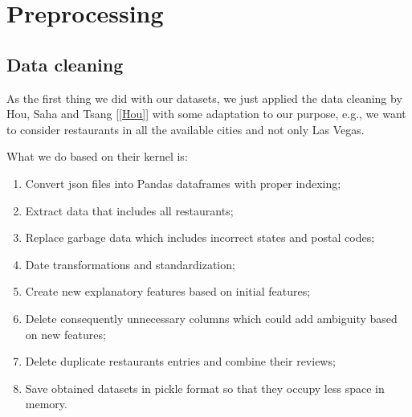 
\section{Preprocessing} \label{sec:preprocessing}

\subsection{Data cleaning} \label{sec:data-clean}

As the first thing we did with our datasets, we just applied the data cleaning by Hou, Saha and Tsang [\ref{Hou}] with some adaptation to our purpose, e.g., we want to consider restaurants in all the available cities and not only Las Vegas.

What we do based on their kernel is:
\begin{enumerate}
	\item Convert json files into Pandas dataframes with proper indexing;
	\item Extract data that includes all restaurants;
	\item Replace garbage data which includes incorrect states and postal codes;
	\item Date transformations and standardization;
	\item Create new explanatory features based on initial features;
	\item Delete consequently unnecessary columns which could add ambiguity based on new features;
	\item Delete duplicate restaurants entries and combine their reviews;
	\item Save obtained datasets in pickle format so that they occupy less space in memory.
\end{enumerate}

